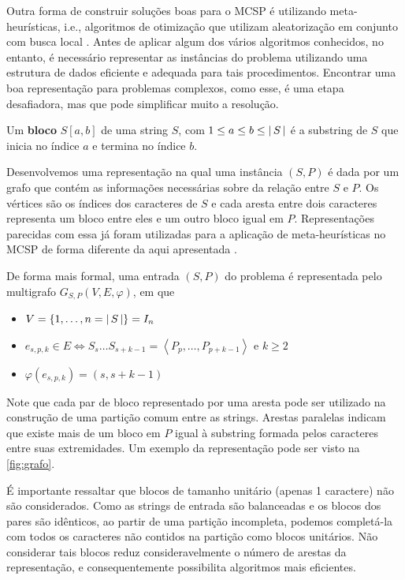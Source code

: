 Outra forma de construir soluções boas para o MCSP é utilizando meta-heurísticas, i.e., algoritmos de otimização que utilizam aleatorização em conjunto com busca local \cite[p.~4]{yang_nature-inspired_2010}. Antes de aplicar algum dos vários algoritmos conhecidos, no entanto, é necessário representar as instâncias do problema utilizando uma estrutura de dados eficiente e adequada para tais procedimentos. Encontrar uma boa representação para problemas complexos, como esse, é uma etapa desafiadora, mas que pode simplificar muito a resolução.

\begin{definition}
    Um \textbf{bloco} $S[a, b]$ de uma string $S$, com $1 \leq a \leq b \leq {\left\lvert\,S\,\right\rvert}$ é a substring de $S$ que inicia no índice $a$ e termina no índice $b$.
\end{definition}

Desenvolvemos uma representação na qual uma instância $(S, P)$ é dada por um grafo que contém as informações necessárias sobre da relação entre $S$ e $P$. Os vértices são os índices dos caracteres de $S$ e cada aresta entre dois caracteres representa um bloco entre eles e um outro bloco igual em $P$. Representações parecidas com essa já foram utilizadas para a aplicação de meta-heurísticas no MCSP de forma diferente da aqui apresentada \cite{ferdous_solving_2013}.

De forma mais formal, uma entrada $(S, P)$ do problema é representada pelo multigrafo $G_{S, P}(V, E, \varphi)$, em que

\begin{itemize}
    \item $V = \set{ 1, \ldots, n = \abs{S}} = I_n$
    \item $e_{s, p, k} \in E \iff S_s \ldots S_{s + k - 1} = \left\langle P_p, \ldots, P_{p + k - 1} \right\rangle \text{ e } k \geq 2$
    \item $\varphi\left(e_{s, p, k}\right) = (s, s + k - 1)$
\end{itemize}

Note que cada par de bloco representado por uma aresta pode ser utilizado na construção de uma partição comum entre as strings. Arestas paralelas indicam que existe mais de um bloco em $P$ igual à substring formada pelos caracteres entre suas extremidades. Um exemplo da representação pode ser visto na \cref{fig:grafo}.

É importante ressaltar que blocos de tamanho unitário (apenas 1 caractere) não são considerados. Como as strings de entrada são balanceadas e os blocos dos pares são idênticos, ao partir de uma partição incompleta, podemos completá-la com todos os caracteres não contidos na partição como blocos unitários. Não considerar tais blocos reduz consideravelmente o número de arestas da representação, e consequentemente possibilita algoritmos mais eficientes.

